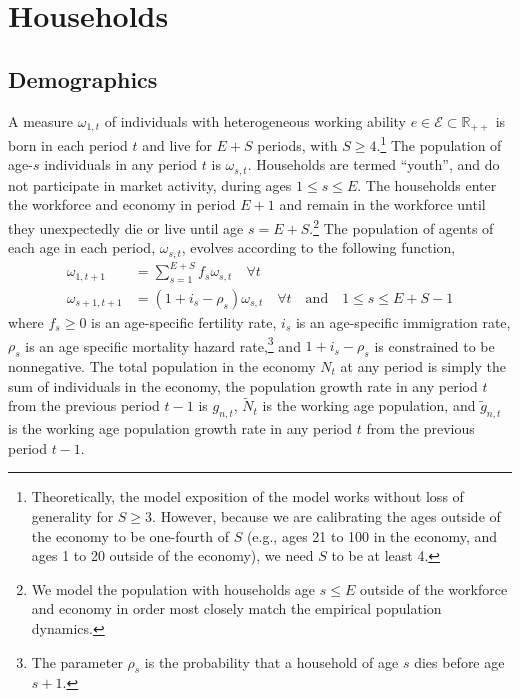 \chapter{Households}
%

  \section{Demographics}
    A measure $\omega_{1,t}$ of individuals with heterogeneous working ability $e \in\mathcal{E}\subset\mathbb{R}_{++}$ is born in each period $t$ and live for $E+S$ periods, with $S\geq 4$.\footnote{Theoretically, the model exposition of the model works without loss of generality for $S\geq 3$. However, because we are calibrating the ages outside of the economy to be one-fourth of $S$ (e.g., ages 21 to 100 in the economy, and ages 1 to 20 outside of the economy), we need $S$ to be at least 4.} The population of age-$s$ individuals in any period $t$ is $\omega_{s,t}$. Households are termed ``youth'', and do not participate in market activity, during ages $1\leq s\leq E$. The households enter the workforce and economy in period $E+1$ and remain in the workforce until they unexpectedly die or live until age $s=E+S$.\footnote{We model the population with households age $s\leq E$ outside of the workforce and economy in order most closely match the empirical population dynamics.} The population of agents of each age in each period, $\omega_{s,t}$, evolves according to the following function,
    \begin{equation}\label{EqPopLawofmotion}
      \begin{split}
        \omega_{1,t+1} &= \sum_{s=1}^{E+S} f_s\omega_{s,t}\quad\forall t \\
        \omega_{s+1,t+1} &= (1 + i_s - \rho_s)\omega_{s,t}\quad\forall t\quad\text{and}\quad 1\leq s \leq E+S-1
      \end{split}
    \end{equation}
    where $f_s\geq 0$ is an age-specific fertility rate, $i_s$ is an age-specific immigration rate, $\rho_s$ is an age specific mortality hazard rate,\footnote{The parameter $\rho_s$ is the probability that a household of age $s$ dies before age $s+1$.} and $1+i_s-\rho_s$ is constrained to be nonnegative. The total population in the economy $N_t$ at any period is simply the sum of individuals in the economy, the population growth rate in any period $t$ from the previous period $t-1$ is $g_{n,t}$, $\tilde{N}_t$ is the working age population, and $\tilde{g}_{n,t}$ is the working age population growth rate in any period $t$ from the previous period $t-1$.

